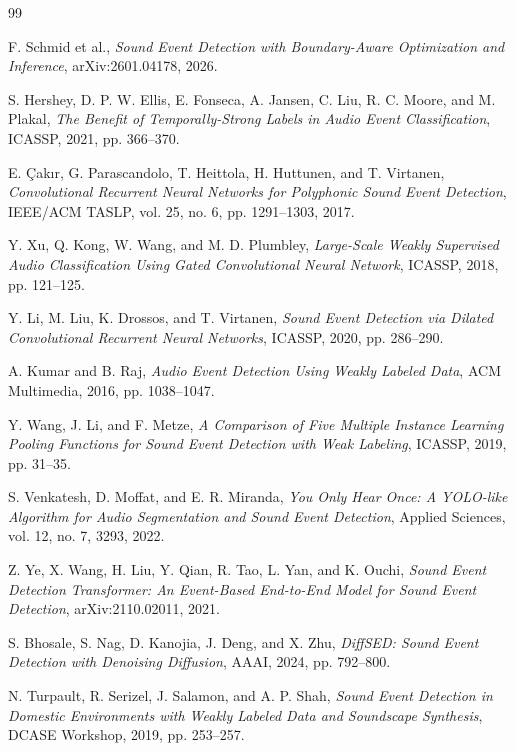 \documentclass[10pt,a4paper]{article}
\begin{document}
\begin{thebibliography}{99}

F. Schmid et al.,
\emph{Sound Event Detection with Boundary-Aware Optimization and Inference},
arXiv:2601.04178, 2026.

S. Hershey, D. P. W. Ellis, E. Fonseca, A. Jansen, C. Liu,
R. C. Moore, and M. Plakal,
\emph{The Benefit of Temporally-Strong Labels in Audio Event Classification},
ICASSP, 2021, pp. 366--370.

E. \c{C}ak{\i}r, G. Parascandolo, T. Heittola, H. Huttunen, and T. Virtanen,
\emph{Convolutional Recurrent Neural Networks for Polyphonic Sound Event
Detection}, IEEE/ACM TASLP, vol. 25, no. 6, pp. 1291--1303, 2017.

Y. Xu, Q. Kong, W. Wang, and M. D. Plumbley,
\emph{Large-Scale Weakly Supervised Audio Classification Using Gated
Convolutional Neural Network}, ICASSP, 2018, pp. 121--125.

Y. Li, M. Liu, K. Drossos, and T. Virtanen,
\emph{Sound Event Detection via Dilated Convolutional Recurrent Neural
Networks}, ICASSP, 2020, pp. 286--290.

A. Kumar and B. Raj,
\emph{Audio Event Detection Using Weakly Labeled Data}, ACM Multimedia, 2016,
pp. 1038--1047.

Y. Wang, J. Li, and F. Metze,
\emph{A Comparison of Five Multiple Instance Learning Pooling Functions for
Sound Event Detection with Weak Labeling}, ICASSP, 2019, pp. 31--35.

S. Venkatesh, D. Moffat, and E. R. Miranda,
\emph{You Only Hear Once: A YOLO-like Algorithm for Audio Segmentation and
Sound Event Detection}, Applied Sciences, vol. 12, no. 7, 3293, 2022.

Z. Ye, X. Wang, H. Liu, Y. Qian, R. Tao, L. Yan, and K. Ouchi,
\emph{Sound Event Detection Transformer: An Event-Based End-to-End Model for
Sound Event Detection}, arXiv:2110.02011, 2021.

S. Bhosale, S. Nag, D. Kanojia, J. Deng, and X. Zhu,
\emph{DiffSED: Sound Event Detection with Denoising Diffusion}, AAAI, 2024,
pp. 792--800.

N. Turpault, R. Serizel, J. Salamon, and A. P. Shah,
\emph{Sound Event Detection in Domestic Environments with Weakly Labeled Data
and Soundscape Synthesis}, DCASE Workshop, 2019, pp. 253--257.


\end{thebibliography}
\end{document}
